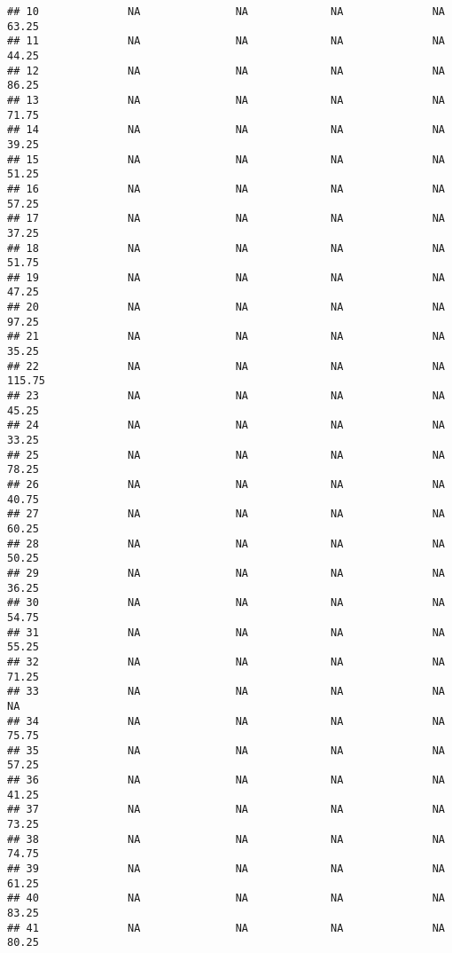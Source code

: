 \documentclass[]{article}
\begin{document}
\begin{verbatim}
## 10              NA               NA             NA              NA       63.25
## 11              NA               NA             NA              NA       44.25
## 12              NA               NA             NA              NA       86.25
## 13              NA               NA             NA              NA       71.75
## 14              NA               NA             NA              NA       39.25
## 15              NA               NA             NA              NA       51.25
## 16              NA               NA             NA              NA       57.25
## 17              NA               NA             NA              NA       37.25
## 18              NA               NA             NA              NA       51.75
## 19              NA               NA             NA              NA       47.25
## 20              NA               NA             NA              NA       97.25
## 21              NA               NA             NA              NA       35.25
## 22              NA               NA             NA              NA      115.75
## 23              NA               NA             NA              NA       45.25
## 24              NA               NA             NA              NA       33.25
## 25              NA               NA             NA              NA       78.25
## 26              NA               NA             NA              NA       40.75
## 27              NA               NA             NA              NA       60.25
## 28              NA               NA             NA              NA       50.25
## 29              NA               NA             NA              NA       36.25
## 30              NA               NA             NA              NA       54.75
## 31              NA               NA             NA              NA       55.25
## 32              NA               NA             NA              NA       71.25
## 33              NA               NA             NA              NA          NA
## 34              NA               NA             NA              NA       75.75
## 35              NA               NA             NA              NA       57.25
## 36              NA               NA             NA              NA       41.25
## 37              NA               NA             NA              NA       73.25
## 38              NA               NA             NA              NA       74.75
## 39              NA               NA             NA              NA       61.25
## 40              NA               NA             NA              NA       83.25
## 41              NA               NA             NA              NA       80.25

\end{verbatim}
\end{document}
